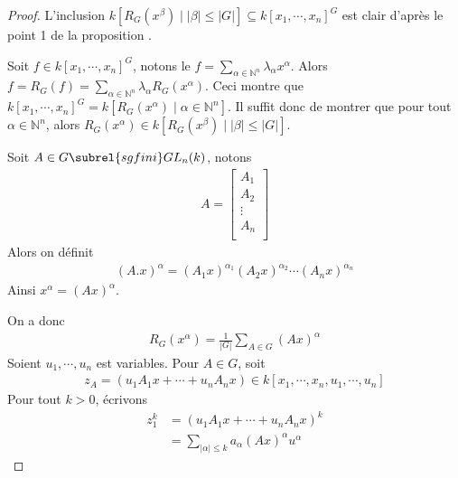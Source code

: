         \begin{proof}
            \item L'inclusion $k[R_G(x^\beta) \mid |\beta| \leq |G|] \subseteq k[x_1, \cdots, x_n]^G$ est clair d'après le point 1 de la proposition \label{431}.
            \item Soit $f \in k[x_1, \cdots, x_n]^G$, notons le $f = \sum_{\alpha \in \mathbb{N}^n} \lambda_\alpha x^\alpha$. Alors $f = R_G(f) = \sum_{\alpha \in \mathbb{N}^n} \lambda_\alpha R_G(x^\alpha)$. Ceci montre que $k[x_1, \cdots, x_n]^G = k[R_G(x^\alpha) \mid \alpha \in \mathbb{N}^n]$. Il suffit donc de montrer que pour tout $\alpha \in \mathbb{N}^n$, alors $R_G(x^\alpha) \in k[R_G(x^\beta) \mid |\beta| \leq |G|]$.
            \begin{nota}
                Soit $A \in G \subrel{sg fini} GL_n(k)$, notons
                \begin{align*}
                    A =
                    \begin{bmatrix}
                        A_1 \\
                        A_2 \\
                        \vdots \\
                        A_n \\
                    \end{bmatrix}
                \end{align*}
                Alors on définit
                \begin{align*}
                    (A.x)^\alpha = (A_1x)^{\alpha_1} (A_2x)^{\alpha_2} \cdots (A_nx)^{\alpha_n}
                \end{align*}
                Ainsi $x^\alpha = (Ax)^\alpha$.
            \end{nota}
            On a donc
            \begin{align*}
                R_G(x^\alpha) = \frac 1{|G|} \sum_{A \in G} (Ax)^\alpha
            \end{align*}
            Soient $u_1, \cdots, u_n$ est variables. Pour $A \in G$, soit 
            \begin{align*}
                z_A = (u_1A_1x + \cdots + u_nA_nx) \in k[x_1, \cdots, x_n, u_1, \cdots, u_n]
            \end{align*}
            Pour tout $k > 0$, écrivons
            \begin{align*}
                z_1^k &= (u_1A_1x + \cdots + u_nA_nx)^k \\
                &= \sum_{|\alpha| \leq k} a_\alpha (Ax)^\alpha u^\alpha

\end{align*}
\end{proof}

